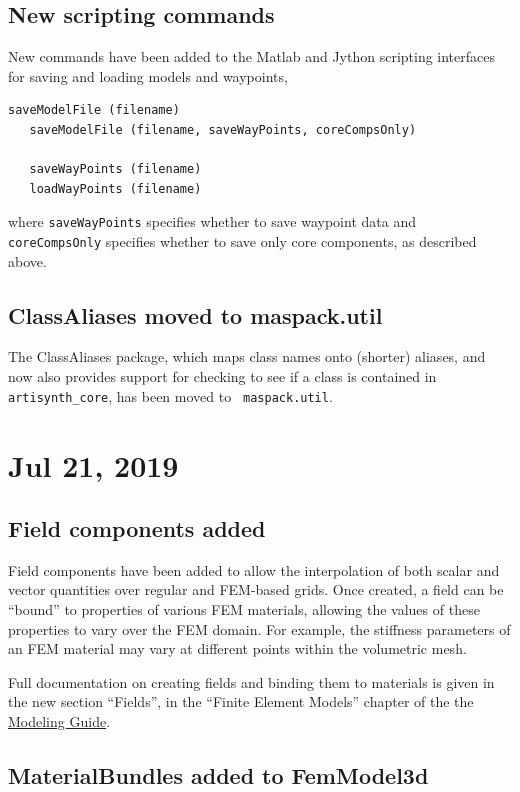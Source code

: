 \documentclass{article}
\begin{document}
\subsection*{New scripting commands}

New commands have been added to the Matlab and Jython scripting
interfaces for saving and loading models and waypoints,
%
\begin{lstlisting}[]
   saveModelFile (filename)
   saveModelFile (filename, saveWayPoints, coreCompsOnly)

   saveWayPoints (filename)
   loadWayPoints (filename)
\end{lstlisting}
%
where {\tt saveWayPoints} specifies whether to save waypoint data and
{\tt coreCompsOnly} specifies whether to save only core components, as
described above.

\subsection*{ClassAliases moved to maspack.util}

The ClassAliases package, which maps class names onto (shorter)
aliases, and now also provides support for checking to see if a class
is contained in {\tt artisynth\_core}, has been moved to {\tt
maspack.util}.

\section*{Jul 21, 2019}

\subsection*{Field components added}

Field components have been added to allow the interpolation of both
scalar and vector quantities over regular and FEM-based grids.  Once
created, a field can be ``bound'' to properties of various FEM
materials, allowing the values of these properties to vary over the
FEM domain. For example, the stiffness parameters of an FEM material
may vary at different points within the volumetric mesh.

Full documentation on creating fields and binding them to materials is
given in the new section ``Fields'', in the ``Finite Element Models''
chapter of the the
\href{http://www.artisynth.org/doc/info/modelguide/modelguide.html}
{Modeling Guide}.

\subsection*{MaterialBundles added to FemModel3d}
\end{document}
